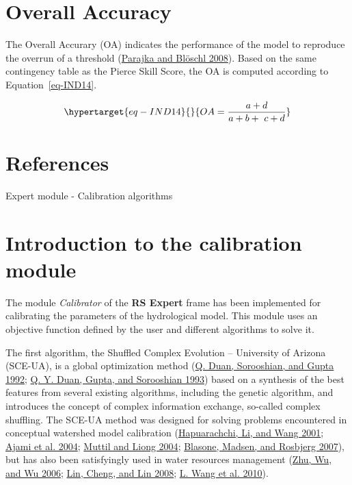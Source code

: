 \documentclass[
  letterpaper,
  DIV=11,
  numbers=noendperiod]{scrreprt}
\begin{document}
\hypertarget{sec-tech_performance_indicators_oa}{%
\chapter{Overall Accuracy}\label{sec-tech_performance_indicators_oa}}

The Overall Accurary (OA) indicates the performance of the model to
reproduce the overrun of a threshold
(\protect\hyperlink{ref-parajka_spatio-temporal_2008}{Parajka and
Blöschl 2008}). Based on the same contingency table as the Pierce Skill
Score, the OA is computed according to Equation~\ref{eq-IND14}.

\begin{equation}\protect\hypertarget{eq-IND14}{}{
OA = \frac{a + d}{a + b + \ c + d}
}\label{eq-IND14}\end{equation}

\hypertarget{references-4}{%
\chapter*{References}\label{references-4}}

Expert module - Calibration algorithms

\hypertarget{sec-tech_calibration_algorithms_intro}{%
\chapter{Introduction to the calibration
module}\label{sec-tech_calibration_algorithms_intro}}

The module \emph{Calibrator} of the \textbf{RS Expert} frame has been
implemented for calibrating the parameters of the hydrological model.
This module uses an objective function defined by the user and different
algorithms to solve it.

The first algorithm, the Shuffled Complex Evolution -- University of
Arizona (SCE-UA), is a global optimization method
(\protect\hyperlink{ref-duan_effective_1992}{Q. Duan, Sorooshian, and
Gupta 1992}; \protect\hyperlink{ref-duan_shuffled_1993}{Q. Y. Duan,
Gupta, and Sorooshian 1993}) based on a synthesis of the best features
from several existing algorithms, including the genetic algorithm, and
introduces the concept of complex information exchange, so-called
complex shuffling. The SCE-UA method was designed for solving problems
encountered in conceptual watershed model calibration
(\protect\hyperlink{ref-hapuarachchi_application_2001}{Hapuarachchi, Li,
and Wang 2001}; \protect\hyperlink{ref-ajami_calibration_2004}{Ajami et
al. 2004}; \protect\hyperlink{ref-muttil_superior_2004}{Muttil and Liong
2004}; \protect\hyperlink{ref-blasone_parameter_2007}{Blasone, Madsen,
and Rosbjerg 2007}), but has also been satisfyingly used in water
resources management (\protect\hyperlink{ref-zhu_application_2006}{Zhu,
Wu, and Wu 2006}; \protect\hyperlink{ref-lin_pareto_2008}{Lin, Cheng,
and Lin 2008}; \protect\hyperlink{ref-wang_development_2010}{L. Wang et
al. 2010}).
\end{document}
